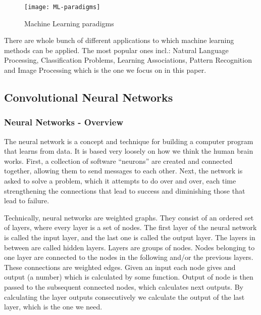 \documentclass[../Main.tex]{subfiles}
\begin{document}
    \begin{figure}[h]
        \centering
        \texttt{[image: ML-paradigms]}
        \caption{Machine Learning paradigms}
        \label{fig:ML-paradigms}
    \end{figure}

\newpage
    There are whole bunch of different applications to which machine learning methods can be applied. The most popular ones incl.: Natural Language Processing, Classification Problems, Learning Associations, Pattern Recognition and Image Processing which is the one we focus on in this paper.

\subsection{Convolutional Neural Networks}


    \subsubsection{Neural Networks - Overview}
    The neural network is a concept and technique for building a computer program that learns from data. It is based very loosely on how we think the human brain works. First, a collection of software “neurons” are created and connected together, allowing them to send messages to each other. Next, the network is asked to solve a problem, which it attempts to do over and over, each time strengthening the connections that lead to success and diminishing those that lead to failure.
    
     Technically, neural networks are weighted graphs. They consist of an ordered set of layers, where every layer is a set of nodes. The first layer of the neural network is called the input layer, and the last one is called the output layer. The layers in between are called hidden layers. Layers are groups of nodes. Nodes belonging to one layer are connected to the nodes in the following and/or the previous layers. These connections are weighted edges. 
    Given an input each node gives and output (a number) which is calculated by some function. Output of node is then passed to the subsequent connected nodes, which calculates next outputs. By calculating the layer outputs consecutively we calculate the output of the last layer, which is the one we need.
    
\end{document}

